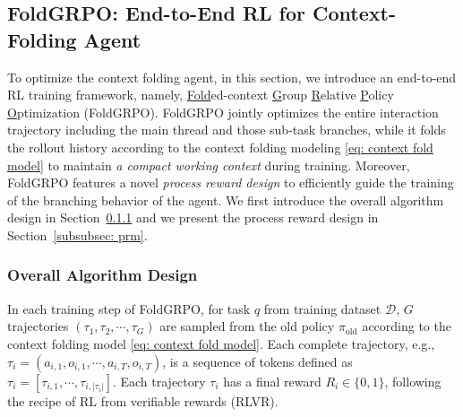 \subsection{FoldGRPO: End-to-End RL for Context-Folding Agent}
To optimize the context folding agent, in this section, we introduce an end-to-end RL training framework, namely, \underline{Fold}ed-context \underline{G}roup \underline{R}elative \underline{P}olicy \underline{O}ptimization (FoldGRPO). 
FoldGRPO jointly optimizes the entire interaction trajectory including the main thread and those sub-task branches, while it folds the rollout history according to the context folding modeling \eqref{eq: context fold model} to maintain \textit{a compact working context} during training.
Moreover, FoldGRPO features a novel \textit{process reward design} to efficiently guide the training of the branching behavior of the agent. 
We first introduce the overall algorithm design in Section~\ref{subsubsec: overall} and we present the process reward design in Section~\ref{subsubsec: prm}.



\subsubsection{Overall Algorithm Design}\label{subsubsec: overall}
In each training step of FoldGRPO, for task $q$ from training dataset $\mathcal{D}$, $G$ trajectories $(\tau_1, \tau_2, \cdots, \tau_G)$ are sampled from the old policy $\pi_{\text{old}}$ according to the context folding model \eqref{eq: context fold model}.
Each complete trajectory, e.g., $\tau_i = (a_{i,1}, o_{i,1}, \cdots,a_{i,T},o_{i,T})$, is a sequence of tokens defined as $\tau_i = [\tau_{i,1}, \cdots, \tau_{i,|\tau_i|}]$.
Each trajectory $\tau_i$ has a final reward $R_i \in \{0, 1\}$, following the recipe of RL from verifiable rewards (RLVR).


